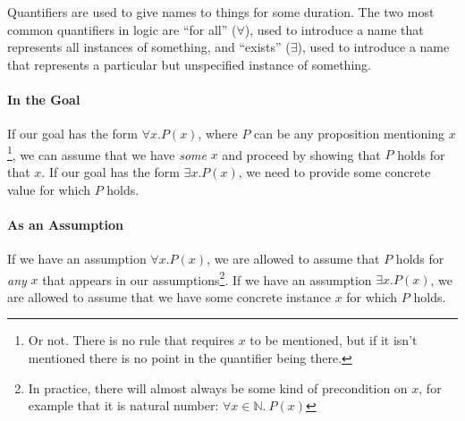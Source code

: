 \documentclass{tufte-handout}
\newcounter{example}
\begin{document}
Quantifiers are used to give names to things for some duration.
The two most common quantifiers in logic are ``for all''
($\forall$), used to introduce a name that represents all
instances of something, and ``exists'' ($\exists$), used to
introduce a name that represents a particular but unspecified
instance of something.

\paragraph{In the Goal}
If our goal has the form $\forall x. P(x)$, where $P$ can be any
proposition mentioning $x$\footnote{Or not. There is no rule that
  requires $x$ to be mentioned, but if it isn't mentioned there is
  no point in the quantifier being there.}, we can assume that we
have \emph{some} $x$ and proceed by showing that $P$ holds for
that $x$.
%
If our goal has the form $\exists x. P(x)$, we need to provide some
concrete value for which $P$ holds.

\paragraph{As an Assumption}
If we have an assumption $\forall x. P(x)$, we are allowed to
assume that $P$ holds for \emph{any} $x$ that appears in our
assumptions\footnote{In practice, there will almost always be some
  kind of precondition on $x$, for example that it is natural
  number: $\forall x\in\mathbb{N}.~P(x)$}.
%
If we have an assumption $\exists x. P(x)$, we are allowed to
assume that we have some concrete instance $x$ for which $P$
holds.
\end{document}

